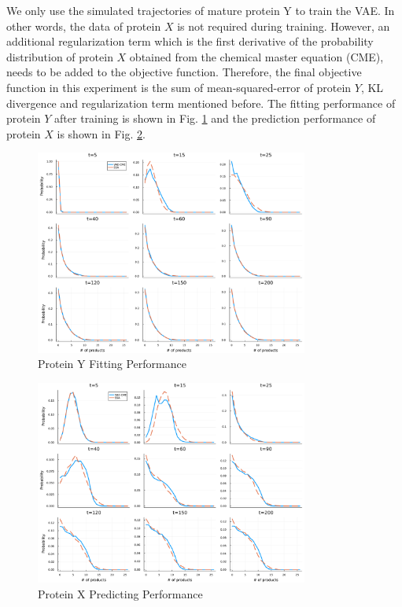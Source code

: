\documentclass[a4paper,10pt]{article}
\begin{document}
We only use the simulated trajectories of mature protein Y to train the VAE. In other words, the data of protein $X$ is not required during training. However, an additional regularization term which is the first derivative of the probability distribution of protein $X$ obtained from the chemical master equation (CME), needs to be added to the objective function. Therefore, the final objective function in this experiment is the sum of mean-squared-error of protein $Y$, KL divergence and regularization term mentioned before. The fitting performance of protein $Y$ after training is shown in Fig. \ref{Oscillation_Y_fitting} and the prediction performance of protein $X$ is shown in Fig. \ref{Oscillation_X_predicting}.
\begin{figure}[h]
	\centering
	\includegraphics[width=0.8\textwidth]{Figs/Oscillation_Y_fitting.pdf}
	\caption{Protein Y Fitting Performance}\label{Oscillation_Y_fitting}  
\end{figure}
\begin{figure}[h]
	\centering
	\includegraphics[width=0.8\textwidth]{Figs/Oscillation_X_predicting.pdf}
	\caption{Protein X Predicting Performance}\label{Oscillation_X_predicting}  
\end{figure}
\newpage
\end{document}
